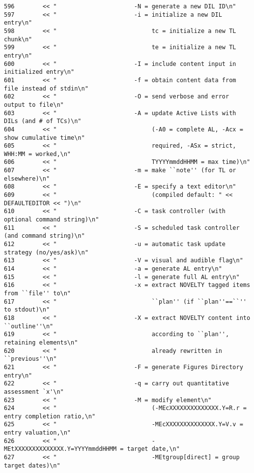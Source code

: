 \begin{verbatim}
596        << "                      -N = generate a new DIL ID\n"
597        << "                      -i = initialize a new DIL entry\n"
598        << "                           tc = initialize a new TL chunk\n"
599        << "                           te = initialize a new TL entry\n"
600        << "                      -I = include content input in initialized entry\n"
601        << "                      -f = obtain content data from file instead of stdin\n"
602        << "                      -O = send verbose and error output to file\n"
603        << "                      -A = update Active Lists with DILs (and # of TCs)\n"
604        << "                           (-A0 = complete AL, -Acx = show cumulative time\n"
605        << "                           required, -ASx = strict, WHH:MM = worked,\n"
606        << "                           TYYYYmmddHHMM = max time)\n"
607        << "                      -m = make ``note'' (for TL or elsewhere)\n"
608        << "                      -E = specify a text editor\n"
609        << "                           (compiled default: " << DEFAULTEDITOR << ")\n"
610        << "                      -C = task controller (with optional command string)\n"
611        << "                      -S = scheduled task controller (and command string)\n"
612        << "                      -u = automatic task update strategy (no/yes/ask)\n"
613        << "                      -V = visual and audible flag\n"
614        << "                      -a = generate AL entry\n"
615        << "                      -l = generate full AL entry\n"
616        << "                      -x = extract NOVELTY tagged items from ``file'' to\n"
617        << "                           ``plan'' (if ``plan''==``'' to stdout)\n"
618        << "                      -X = extract NOVELTY content into ``outline''\n"
619        << "                           according to ``plan'', retaining elements\n"
620        << "                           already rewritten in ``previous''\n"
621        << "                      -F = generate Figures Directory entry\n"
622        << "                      -q = carry out quantitative assessment `x'\n"
623        << "                      -M = modify element\n"
624        << "                           (-MEcXXXXXXXXXXXXXX.Y=R.r = entry completion ratio,\n"
625        << "                           -MEcXXXXXXXXXXXXXX.Y=V.v = entry valuation,\n"
626        << "                           -MEtXXXXXXXXXXXXXX.Y=YYYYmmddHHMM = target date,\n"
627        << "                           -MEtgroup[direct] = group target dates)\n"

\end{verbatim}
